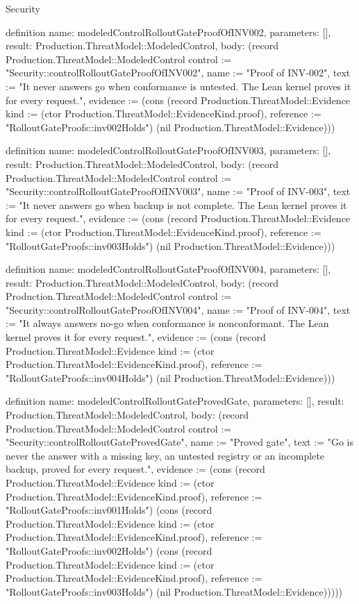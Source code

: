 \begin{lexlean}{Security}
\begin{semanticmodule}
definition{
  name: modeledControlRolloutGateProofOfINV002,
  parameters: [],
  result: Production.ThreatModel::ModeledControl,
  body: (record Production.ThreatModel::ModeledControl {control := "Security::controlRolloutGateProofOfINV002", name := "Proof of INV-002", text := "It never answers go when conformance is untested. The Lean kernel proves it for every request.", evidence := (cons (record Production.ThreatModel::Evidence {kind := (ctor Production.ThreatModel::EvidenceKind.proof), reference := "RolloutGateProofs::inv002Holds"}) (nil Production.ThreatModel::Evidence))})
}

definition{
  name: modeledControlRolloutGateProofOfINV003,
  parameters: [],
  result: Production.ThreatModel::ModeledControl,
  body: (record Production.ThreatModel::ModeledControl {control := "Security::controlRolloutGateProofOfINV003", name := "Proof of INV-003", text := "It never answers go when backup is not complete. The Lean kernel proves it for every request.", evidence := (cons (record Production.ThreatModel::Evidence {kind := (ctor Production.ThreatModel::EvidenceKind.proof), reference := "RolloutGateProofs::inv003Holds"}) (nil Production.ThreatModel::Evidence))})
}

definition{
  name: modeledControlRolloutGateProofOfINV004,
  parameters: [],
  result: Production.ThreatModel::ModeledControl,
  body: (record Production.ThreatModel::ModeledControl {control := "Security::controlRolloutGateProofOfINV004", name := "Proof of INV-004", text := "It always answers no-go when conformance is nonconformant. The Lean kernel proves it for every request.", evidence := (cons (record Production.ThreatModel::Evidence {kind := (ctor Production.ThreatModel::EvidenceKind.proof), reference := "RolloutGateProofs::inv004Holds"}) (nil Production.ThreatModel::Evidence))})
}

definition{
  name: modeledControlRolloutGateProvedGate,
  parameters: [],
  result: Production.ThreatModel::ModeledControl,
  body: (record Production.ThreatModel::ModeledControl {control := "Security::controlRolloutGateProvedGate", name := "Proved gate", text := "Go is never the answer with a missing key, an untested registry or an incomplete backup, proved for every request.", evidence := (cons (record Production.ThreatModel::Evidence {kind := (ctor Production.ThreatModel::EvidenceKind.proof), reference := "RolloutGateProofs::inv001Holds"}) (cons (record Production.ThreatModel::Evidence {kind := (ctor Production.ThreatModel::EvidenceKind.proof), reference := "RolloutGateProofs::inv002Holds"}) (cons (record Production.ThreatModel::Evidence {kind := (ctor Production.ThreatModel::EvidenceKind.proof), reference := "RolloutGateProofs::inv003Holds"}) (nil Production.ThreatModel::Evidence))))})
}


\end{semanticmodule}
\end{lexlean}
